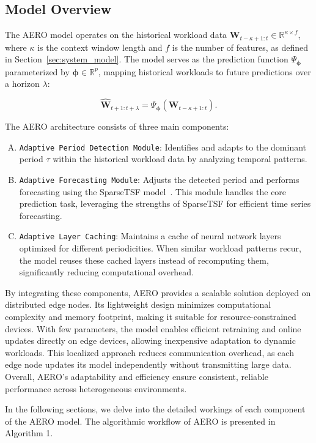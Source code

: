 \documentclass{ieeetmlcn}
\begin{document}
\subsection*{Model Overview}


The AERO model operates on the historical workload data $\mathbf{W}_{t-\kappa+1:t} \in \mathbb{R}^{\kappa \times f}$, where $\kappa$ is the context window length and $f$ is the number of features, as defined in Section~\ref{sec:system_model}. The model serves as the prediction function $\Psi_{\boldsymbol{\phi}}$ parameterized by $\boldsymbol{\phi} \in \mathbb{R}^p$, mapping historical workloads to future predictions over a horizon $\lambda$:

\begin{equation}
\label{eq:aero_prediction_function}
\hat{\mathbf{W}}_{t+1:t+\lambda} = \Psi_{\boldsymbol{\phi}}\left( \mathbf{W}_{t-\kappa+1:t} \right).
\end{equation}

The AERO architecture consists of three main components:
\begin{enumerate}[A.]
    \item \texttt{Adaptive Period Detection Module}: Identifies and adapts to the dominant period $\tau$ within the historical workload data by analyzing temporal patterns.

    \item \texttt{Adaptive Forecasting Module}: Adjusts the detected period and performs forecasting using the SparseTSF model~\cite{sparseTSF}. This module handles the core prediction task, leveraging the strengths of SparseTSF for efficient time series forecasting.

    \item \texttt{Adaptive Layer Caching}: Maintains a cache of neural network layers optimized for different periodicities. When similar workload patterns recur, the model reuses these cached layers instead of recomputing them, significantly reducing computational overhead.
\end{enumerate}

{\color{blue}
By integrating these components, AERO provides a scalable solution deployed on distributed edge nodes. Its lightweight design minimizes computational complexity and memory footprint, making it suitable for resource-constrained devices. With few parameters, the model enables efficient retraining and online updates directly on edge devices, allowing inexpensive adaptation to dynamic workloads. This localized approach reduces communication overhead, as each edge node updates its model independently without transmitting large data. Overall, AERO's adaptability and efficiency ensure consistent, reliable performance across heterogeneous environments.

In the following sections, we delve into the detailed workings of each component of the AERO model. The algorithmic workflow of AERO is presented in Algorithm 1.
}
\end{document}
